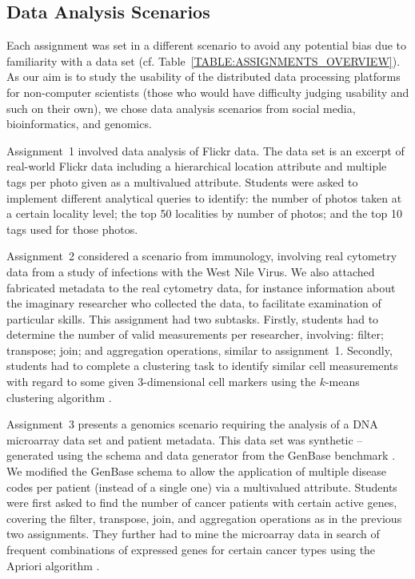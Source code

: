 \subsection{Data Analysis Scenarios}

  Each assignment was set in a different scenario to avoid any potential bias due to familiarity with a data set (cf. Table~\ref{TABLE:ASSIGNMENTS_OVERVIEW}). As our aim is to study the usability of the distributed data processing platforms for non-computer scientists (those who would have difficulty judging usability and such on their own), we chose data analysis scenarios from social media, bioinformatics, and genomics.
  
  Assignment~1 involved data analysis of Flickr data. The data set is an excerpt of real-world Flickr data including a hierarchical location attribute and multiple tags per photo given as a multivalued attribute. Students were asked to implement different analytical queries to identify: the number of photos taken at a certain locality level; the top 50 localities by number of photos; and the top 10 tags used for those photos.
  
  Assignment~2 considered a scenario from immunology, involving real cytometry data from a study of infections with the West Nile Virus. We also attached fabricated metadata to the real cytometry data, for instance information about the imaginary researcher who collected the data, to facilitate examination of particular skills. This assignment had two subtasks. Firstly, students had to determine the number of valid measurements per researcher, involving: filter; transpose; join; and aggregation operations, similar to assignment~1. Secondly, students had to complete a clustering task to identify similar cell measurements with regard to some given 3-dimensional cell markers using the $k$-means clustering algorithm \cite{hartigan1979algorithm}.
  
  Assignment~3 presents a genomics scenario requiring the analysis of a DNA microarray data set and patient metadata. This data set was synthetic -- generated using the schema and data generator from the GenBase benchmark \cite{TaftVSSMS:SIGMOD2014}. We modified the GenBase schema to allow the application of multiple disease codes per patient (instead of a single one) via a multivalued attribute. Students were first asked to find the number of cancer patients with certain active genes, covering the filter, transpose, join, and aggregation operations as in the previous two assignments. They further had to mine the microarray data in search of frequent combinations of expressed genes for certain cancer types using the Apriori algorithm \cite{agrawal1994fast}.


